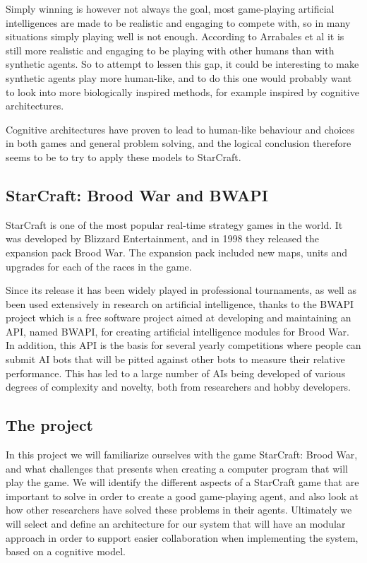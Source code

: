 Simply winning is however not always the goal, most game-playing artificial
intelligences are made to be realistic and engaging to compete with, so in many
situations simply playing well is not enough. According to Arrabales et
al \cite{arrabales2009gamechars} it is still more realistic and engaging to be
playing with other humans than with synthetic agents. So to attempt to lessen
this gap, it could be interesting to make synthetic agents play more human-like,
and to do this one would probably want to look into more biologically inspired
methods, for example inspired by cognitive architectures.

Cognitive architectures have proven to lead to human-like behaviour and choices
in both games\cite{arrabales2009gamechars} and general problem
solving\cite{franklin2003interacting}, and the logical conclusion therefore
seems to be to try to apply these models to StarCraft.

\subsection{StarCraft: Brood War and BWAPI}
\label{sec:scbw}
StarCraft is one of the most popular real-time strategy games in the world. It
was developed by Blizzard Entertainment, and in 1998 they released the expansion
pack Brood War. The expansion pack included new maps, units and upgrades for
each of the races in the game.
 
Since its release it has been widely played in professional tournaments, as well
as been used extensively in research on artificial intelligence, thanks to the
BWAPI project which is a free software project aimed at developing and
maintaining an API, named BWAPI, for creating artificial intelligence modules
for Brood War. In addition, this API is the basis for several yearly
competitions where people can submit AI bots that will be pitted against other
bots to measure their relative performance. This has led to a large number of
AIs being developed of various degrees of complexity and novelty, both from
researchers and hobby developers. 

\subsection{The project}
\label{sec:project}
In this project we will familiarize ourselves with the game StarCraft: Brood
War, and what challenges that presents when creating a computer program that
will play the game. We will identify the different aspects of a StarCraft game
that are important to solve in order to create a good game-playing agent, and
also look at how other researchers have solved these problems in their agents.
Ultimately we will select and define an architecture for our system that will
have an modular approach in order to support easier collaboration when
implementing the system, based on a cognitive model.

